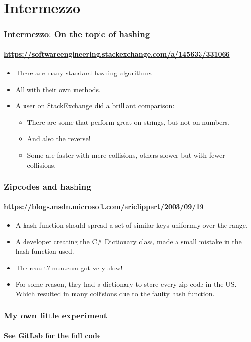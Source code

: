 \section{Intermezzo}
\label{sec:intermezzo}

\begin{frame}
	\frametitle{Intermezzo: On the topic of hashing}
	\framesubtitle{\url{https://softwareengineering.stackexchange.com/a/145633/331066}}

	\begin{itemize}
		\item There are many standard hashing algorithms.
					\pause
		\item All with their own methods.
					\pause
		\item A user on StackExchange did a brilliant comparison:
			\begin{itemize}
				\item There are some that perform great on strings, but not on numbers.
				\item And also the reverse!
					\pause
				\item Some are faster with more collisions, others slower but with fewer collisions.
			\end{itemize}
	\end{itemize}
\end{frame}

\begin{frame}
	\frametitle{Zipcodes and hashing}
	\framesubtitle{\url{https://blogs.msdn.microsoft.com/ericlippert/2003/09/19}}
	\begin{itemize}
		\item A hash function should spread a set of similar keys uniformly over the range.
			\pause
		\item A developer creating the C\# Dictionary class, made a small mistake in the hash function used.
			\pause
		\item The result? \url{msn.com} got very slow!
			\pause
		\item For some reason, they had a dictionary to store every zip code in the US. Which resulted in many collisions
			due to the faulty hash function.
	\end{itemize}
\end{frame}

\begin{frame}
	\frametitle{My own little experiment}
	\framesubtitle{See GitLab for the full code}
	\begin{columns}
			
	
	\pause
	
			
	\pause
	\end{columns}
	\pause
	
\end{frame}



